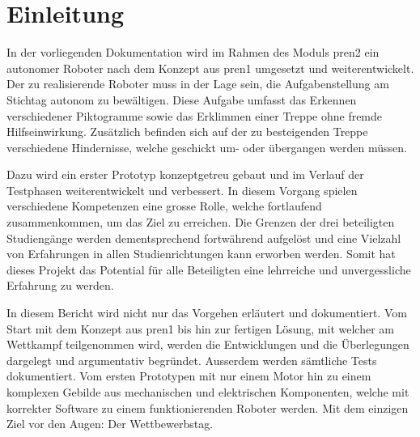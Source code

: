 \section{Einleitung}

In der vorliegenden Dokumentation wird im Rahmen des Moduls \acrfull{pren2} ein autonomer Roboter nach dem Konzept aus \acrfull{pren1} umgesetzt und weiterentwickelt. Der zu realisierende Roboter muss in der Lage sein, die Aufgabenstellung am Stichtag autonom zu bewältigen. Diese Aufgabe umfasst das Erkennen verschiedener Piktogramme sowie das Erklimmen einer Treppe ohne fremde Hilfseinwirkung. Zusätzlich befinden sich auf der zu besteigenden Treppe verschiedene Hindernisse, welche geschickt um- oder übergangen werden müssen.

Dazu wird ein erster Prototyp konzeptgetreu gebaut und im Verlauf der Testphasen weiterentwickelt und verbessert. In diesem Vorgang spielen verschiedene Kompetenzen eine grosse Rolle, welche fortlaufend zusammenkommen, um das Ziel zu erreichen. Die Grenzen der drei beteiligten Studiengänge werden dementsprechend fortwährend aufgelöst und eine Vielzahl von Erfahrungen in allen Studienrichtungen kann erworben werden. Somit hat dieses Projekt das Potential für alle Beteiligten eine lehrreiche und unvergessliche Erfahrung zu werden.

In diesem Bericht wird nicht nur das Vorgehen erläutert und dokumentiert. Vom Start mit dem Konzept aus \acrshort{pren1} bis hin zur fertigen Lösung, mit welcher am Wettkampf teilgenommen wird, werden die Entwicklungen und die Überlegungen dargelegt und argumentativ begründet. Ausserdem werden sämtliche Tests dokumentiert. Vom ersten Prototypen mit nur einem Motor hin zu einem komplexen Gebilde aus mechanischen und elektrischen Komponenten, welche mit korrekter Software zu einem funktionierenden Roboter werden. Mit dem einzigen Ziel vor den Augen: Der Wettbewerbstag.

